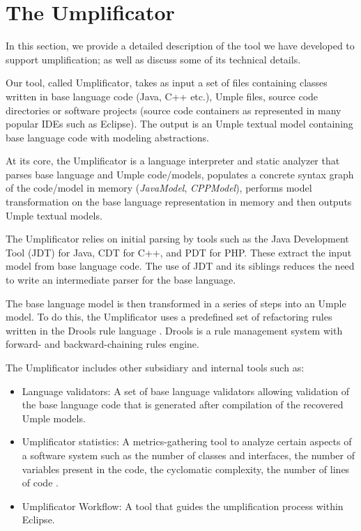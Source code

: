\section{The Umplificator}
\label{chap:tool}
In this section, we provide a detailed description of the tool we have developed to support umplification; as well as discuss some of its technical details.

Our tool, called Umplificator, takes as input  a set of files containing classes written in base language code (Java, C++ etc.), Umple files, source code directories or software projects (source code containers as represented in many popular IDEs such as Eclipse). The output is an Umple textual model containing base language code with modeling abstractions.

At its core, the Umplificator is a language interpreter and static analyzer that parses base language and Umple code/models, populates a concrete syntax graph of the code/model in memory (\textit{JavaModel}, \textit{CPPModel}), performs model transformation on the base language representation in memory and then outputs Umple textual models.

The Umplificator relies on initial parsing by tools such as the Java Development Tool (JDT) for Java, CDT for C++, and PDT for PHP. These extract the input model from base language code. The use of JDT and its siblings reduces the need to write an intermediate parser for the base language.

The base language model is then transformed in a series of steps into an Umple model. To do this, the Umplificator uses a predefined set of refactoring rules written in the Drools rule language \cite{Drools_Book}. Drools is a rule management system with forward- and backward-chaining rules engine. 

The Umplificator includes other subsidiary and internal tools such as:
\begin{itemize}
\item Language validators:  A set of base language validators allowing validation of the base language code that is generated after compilation of the recovered Umple models.
\item Umplificator statistics: A metrics-gathering tool to analyze certain aspects of a software system such as the number of classes and interfaces, the  number of variables present in the code, the cyclomatic complexity, the number of lines of code \cite{MetricsBuse}.  
\item Umplificator Workflow:  A tool that guides the umplification process within Eclipse.
\end{itemize}

